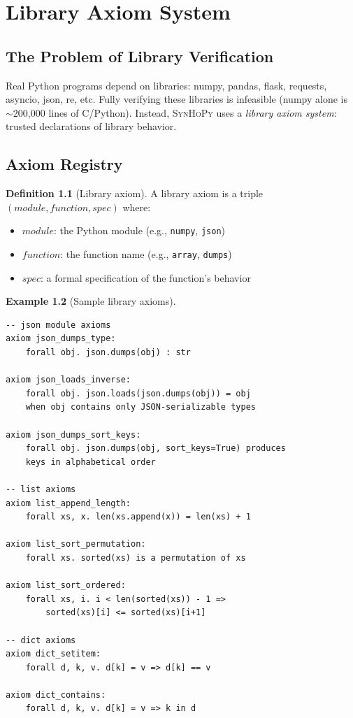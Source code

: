 \documentclass[11pt,a4paper]{report}
\theoremstyle{definition}
\newtheorem{definition}{Definition}[chapter]
\newtheorem{example}[definition]{Example}
\theoremstyle{plain}
\newcommand{\synhopy}{\textsc{SynHoPy}}
\begin{document}
\chapter{Library Axiom System}
\label{ch:library-axioms}

\section{The Problem of Library Verification}

Real Python programs depend on libraries: numpy, pandas, flask, requests,
asyncio, json, re, etc.  Fully verifying these libraries is infeasible
(numpy alone is $\sim$200{,}000 lines of C/Python).  Instead, \synhopy{}
uses a \emph{library axiom system}: trusted declarations of library behavior.

\section{Axiom Registry}

\begin{definition}[Library axiom]
A library axiom is a triple $(\mathit{module}, \mathit{function}, \mathit{spec})$
where:
\begin{itemize}
  \item $\mathit{module}$: the Python module (e.g., \texttt{numpy}, \texttt{json})
  \item $\mathit{function}$: the function name (e.g., \texttt{array}, \texttt{dumps})
  \item $\mathit{spec}$: a formal specification of the function's behavior
\end{itemize}
\end{definition}

\begin{example}[Sample library axioms]
\begin{lstlisting}[style=proof]
-- json module axioms
axiom json_dumps_type:
    forall obj. json.dumps(obj) : str

axiom json_loads_inverse:
    forall obj. json.loads(json.dumps(obj)) = obj
    when obj contains only JSON-serializable types

axiom json_dumps_sort_keys:
    forall obj. json.dumps(obj, sort_keys=True) produces
    keys in alphabetical order

-- list axioms
axiom list_append_length:
    forall xs, x. len(xs.append(x)) = len(xs) + 1

axiom list_sort_permutation:
    forall xs. sorted(xs) is a permutation of xs

axiom list_sort_ordered:
    forall xs, i. i < len(sorted(xs)) - 1 =>
        sorted(xs)[i] <= sorted(xs)[i+1]

-- dict axioms
axiom dict_setitem:
    forall d, k, v. d[k] = v => d[k] == v

axiom dict_contains:
    forall d, k, v. d[k] = v => k in d
\end{lstlisting}
\end{example}
\end{document}
